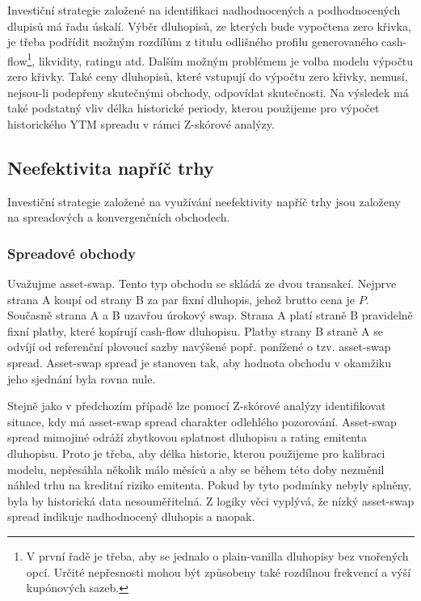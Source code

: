 \documentclass[a4paper]{book}
\begin{document}
Investiční strategie založené na identifikaci nadhodnocených a podhodnocených dlupisů má řadu úskalí. Výběr dluhopisů, ze kterých bude vypočtena zero křivka, je třeba podřídit možným rozdílům z titulu odlišného profilu generovaného cash-flow\footnote{V první řadě je třeba, aby se jednalo o plain-vanilla dluhopisy bez vnořených opcí. Určité nepřesnosti mohou být způsobeny také rozdílnou frekvencí a výší kupónových sazeb.}, likvidity, ratingu atd. Dalším možným problémem je volba modelu výpočtu zero křivky. Také ceny dluhopisů, které vstupují do výpočtu zero křivky, nemusí, nejsou-li podepřeny skutečnými obchody, odpovídat skutečnosti. Na výsledek má také podstatný vliv délka historické periody, kterou použijeme pro výpočet historického YTM spreadu v rámci Z-skórové analýzy.

\subsection{Neefektivita napříč trhy}

Investiční strategie založené na využívání neefektivity napříč trhy jsou založeny na spreadových a konvergenčních obchodech.

\subsubsection{Spreadové obchody}

Uvažujme asset-swap. Tento typ obchodu se skládá ze dvou transakcí. Nejprve strana A koupí od strany B za par fixní dluhopis, jehož brutto cena je $P$. Současně strana A a B uzavřou úrokový swap. Strana A platí straně B pravidelně fixní platby, které kopírují cash-flow dluhopisu. Platby strany B straně A se odvíjí od referenční plovoucí sazby navýšené popř. ponížené o tzv. asset-swap spread. Asset-swap spread je stanoven tak, aby hodnota obchodu v okamžiku jeho sjednání byla rovna nule.

Stejně jako v předchozím případě lze pomocí Z-skórové analýzy identifikovat situace, kdy má asset-swap spread charakter odlehlého pozorování. Asset-swap spread mimojiné odráží zbytkovou splatnost dluhopisu a rating emitenta dluhopisu. Proto je třeba, aby délka historie, kterou použijeme pro kalibraci modelu, nepřesáhla několik málo měsíců a aby se během této doby nezměnil náhled trhu na kreditní riziko emitenta. Pokud by tyto podmínky nebyly splněny, byla by historická data nesouměřitelná. Z logiky věci vyplývá, že nízký asset-swap spread indikuje nadhodnocený dluhopis a naopak.
\end{document}
